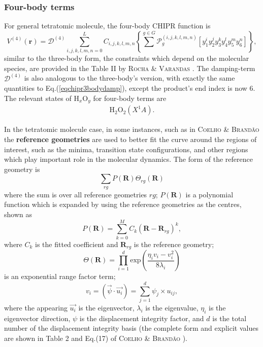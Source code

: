 \documentclass[12pt]{article}
\begin{document}
\subsubsection{Four-body terms}
For general tetratomic molecule, the four-body CHIPR function is
\begin{equation}
    V^{(4)}(\mathbf{r}) = \mathcal{D}^{(4)} \sum^L_{i,j,k,l,m,n=0}C_{i,j,k,l,m,n}\left\{\sum ^{g\in G} \mathcal{P}_g^{(i,j,k,l,m,n)}\left[y_1^iy_2^jy_3^ky_4^ly_5^my_6^n\right]\right\},
    \label{eqchipr4body}
\end{equation}
similar to the three-body form, the constraints which depend on the molecular species, are provided in the Table II by \textsc{Rocha \& Varandas} \cite{idx150}. The damping-term $\mathcal{D}^{(4)}$ is also analogous to the three-body's version, with exactly the same quantities to Eq.(\ref{eqchipr3bodydamp}), except the product's end index is now 6. The relevant states of H$_x$O$_y$ for four-body terms are
\begin{equation}
    \begin{split}
        \text{H}_2\text{O}_2(X^1A).
    \end{split}
\end{equation}

In the tetratomic molecule case, in some instances, such as in \textsc{Coelho \& Brandão} \cite{idx147} the \textbf{reference geometries} are used to better fit the curve around the regions of interest, such as the minima, transition state configurations, and other regions which play important role in the molecular dynamics. The form of the reference geometry is
\begin{equation}
    \sum_{rg}P(\mathbf{R})\Theta_{rg}(\mathbf{R})
    \label{eq:referencegeometry}
\end{equation}
where the sum is over all reference geometries $rg$; $P(\mathbf{R})$ is a polynomial function which is expanded by using the reference geometries as the centres, shown as
\begin{equation}
    P(\mathbf{R}) = \sum^M_{k=0}C_k(\mathbf{R}-\mathbf{R}_{rg})^k,
\end{equation}
where $C_k$ is the fitted coefficient and $\mathbf{R}_{rg}$ is the reference geometry;
\begin{equation}
    \Theta(\mathbf{R}) = \prod_{i=1}^d \text{exp}(\frac{\eta_iv_i-v_i^2}{8\lambda_i})
\end{equation}
is an exponential range factor term;
\begin{equation}
    v_i = (\Vec{\psi}\cdot\Vec{u_i}) = \sum_{j=1}^d\psi_j \times u_{ij},
\end{equation}
where the appearing $\Vec{u_i}$ is the eigenvector, $\lambda_i$ is the eigenvalue, $\eta_i$ is the eigenvector direction, $\psi$ is the displacement integrity factor, and $d$ is the total number of the displacement integrity basis (the complete form and explicit values are shown in Table 2 and Eq.(17) of \textsc{Coelho \& Brandão} \cite{idx147}). 
\end{document}
